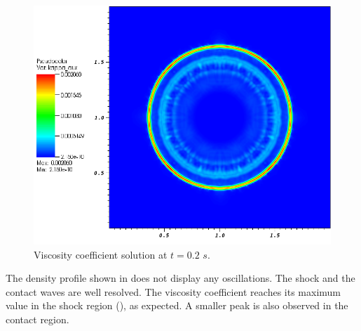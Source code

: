 %
\begin{figure}[H]
\centering
\includegraphics[scale=.50]{figures/Explosion_viscosity_profiles.png}
\caption{Viscosity coefficient solution at $t=0.2$ $s$.}
\label{fig:2d_explosion_visc_sct3}
\end{figure}
%
The density profile shown in  does not display any oscillations. The shock and the contact waves are well resolved. The viscosity coefficient reaches its maximum value in the shock region (), as expected. A smaller peak is also observed in the contact region. 
